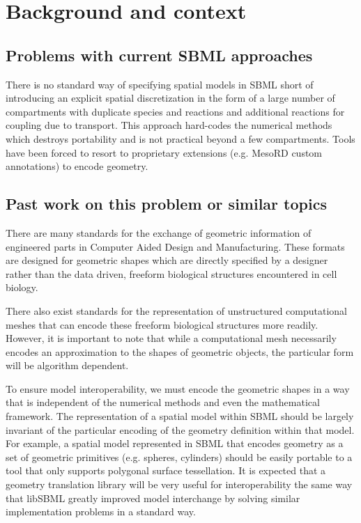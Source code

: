
\section{Background and context}
\label{background}

\subsection{Problems with current SBML approaches}
There is no standard way of specifying spatial models in SBML short of introducing an explicit spatial discretization in the form of a large number of compartments with duplicate species and reactions and additional reactions for coupling due to transport.  This approach hard-codes the numerical methods which destroys portability and is not practical beyond a few compartments.  Tools have been forced to resort to proprietary extensions (e.g. MesoRD custom annotations) to encode geometry. 

\subsection{Past work on this problem or similar topics}
There are many standards for the exchange of geometric information of engineered parts in Computer Aided Design and Manufacturing.  These formats are designed for geometric shapes which are directly specified by a designer rather than the data driven, freeform biological structures encountered in cell biology.  

There also exist standards for the representation of unstructured computational meshes that can encode these freeform biological structures more readily.  However, it is important to note that while a computational mesh necessarily encodes an approximation to the shapes of geometric objects, the particular form will be algorithm dependent.  

To ensure model interoperability, we must encode the geometric shapes in a way that is independent of the numerical methods and even the mathematical framework.  The representation of a spatial model within SBML should be largely invariant of the particular encoding of the geometry definition within that model.  For example, a spatial model represented in SBML that encodes geometry as a set of geometric primitives (e.g. spheres, cylinders) should be easily portable to a tool that only supports polygonal surface tessellation.  It is expected that a geometry translation library will be very useful for interoperability the same way that libSBML greatly improved model interchange by solving similar implementation problems in a standard way.



